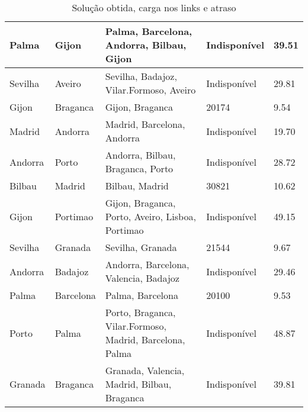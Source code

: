 \begin{table}[!htb]
{\begin{tabular}{|l|l|l|l|l|}
Palma & Gijon & Palma, Barcelona, Andorra, Bilbau, Gijon & Indisponível & 39.51 \\ \hline
Sevilha & Aveiro & Sevilha, Badajoz, Vilar.Formoso, Aveiro & Indisponível & 29.81 \\ \hline
Gijon & Braganca & Gijon, Braganca & 20174 & 9.54 \\ \hline
Madrid & Andorra & Madrid, Barcelona, Andorra & Indisponível & 19.70 \\ \hline
Andorra & Porto & Andorra, Bilbau, Braganca, Porto & Indisponível & 28.72 \\ \hline
Bilbau & Madrid & Bilbau, Madrid & 30821 & 10.62 \\ \hline
Gijon & Portimao & Gijon, Braganca, Porto, Aveiro, Lisboa, Portimao & Indisponível & 49.15 \\ \hline
Sevilha & Granada & Sevilha, Granada & 21544 & 9.67 \\ \hline
Andorra & Badajoz & Andorra, Barcelona, Valencia, Badajoz & Indisponível & 29.46 \\ \hline
Palma & Barcelona & Palma, Barcelona & 20100 & 9.53 \\ \hline
Porto & Palma & Porto, Braganca, Vilar.Formoso, Madrid, Barcelona, Palma & Indisponível & 48.87 \\ \hline
Granada & Braganca & Granada, Valencia, Madrid, Bilbau, Braganca & Indisponível & 39.81 \\ \hline
\end{tabular}}
\caption[]{Solução obtida, carga nos links e atraso}
\end{table}


